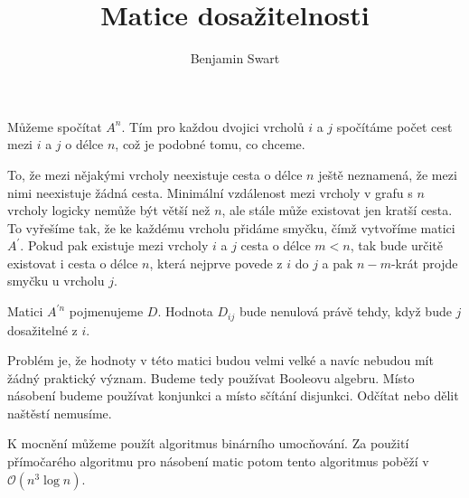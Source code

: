 \documentclass{article}
\title{Matice dosažitelnosti}
\author{Benjamin Swart}
\begin{document}
Můžeme spočítat $A^n$. Tím pro každou dvojici vrcholů $i$ a $j$ spočítáme počet cest mezi $i$ a $j$ o délce $n$, což je podobné tomu, co chceme.

To, že mezi nějakými vrcholy neexistuje cesta o délce $n$ ještě neznamená, že mezi nimi neexistuje žádná cesta. Minimální vzdálenost mezi vrcholy v grafu s $n$ vrcholy logicky nemůže být větší než $n$, ale stále může existovat jen kratší cesta. To vyřešíme tak, že ke každému vrcholu přidáme smyčku, čímž vytvoříme matici $A^\prime$. Pokud pak existuje mezi vrcholy $i$ a $j$ cesta o délce $m < n$, tak bude určitě existovat i cesta o délce $n$, která nejprve povede z $i$ do $j$ a pak $n - m$-krát projde smyčku u vrcholu $j$.

Matici $A^{\prime n}$ pojmenujeme $D$. Hodnota $D_{i j}$ bude nenulová právě tehdy, když bude $j$ dosažitelné z $i$.

Problém je, že hodnoty v této matici budou velmi velké a navíc nebudou mít žádný praktický význam. Budeme tedy používat Booleovu algebru. Místo násobení budeme používat konjunkci a místo sčítání disjunkci. Odčítat nebo dělit naštěstí nemusíme.

K mocnění můžeme použít algoritmus binárního umocňování. Za použití přímočarého algoritmu pro násobení matic potom tento algoritmus poběží v $\mathcal{O} \left(n^3 \log{n}\right)$.
\end{document}
